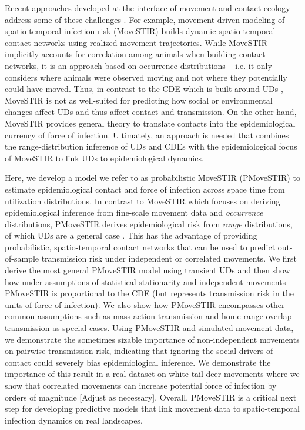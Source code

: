 \documentclass[letterpaper]{article}
\begin{document}
Recent approaches developed at the interface of movement and contact ecology address some of these challenges \citep{Wilber2022,Yang2023}. For example, movement-driven modeling of spatio-temporal infection risk (MoveSTIR) builds dynamic spatio-temporal contact networks using realized movement trajectories. While MoveSTIR implicitly accounts for correlation among animals when building contact networks, it is an approach based on occurrence distributions \citep{Alston2022} -- i.e. it only considers where animals were observed moving and not where they potentially could have moved. Thus, in contrast to the CDE which is built around UDs \citep[a range-distribution method in the terminology of][]{Alston2022}, MoveSTIR is not as well-suited for predicting how social or environmental changes affect UDs and thus affect contact and transmission.  On the other hand, MoveSTIR provides general theory to translate contacts into the epidemiological currency of force of infection. Ultimately, an approach is needed that combines the range-distribution inference of UDs and CDEs \citep{Alston2022,Noonan2021} with the epidemiological focus of MoveSTIR to link UDs to epidemiological dynamics. 

Here, we develop a model we refer to as probabilistic MoveSTIR (PMoveSTIR) to estimate epidemiological contact and force of infection across space time from utilization distributions. In contrast to MoveSTIR which focuses on deriving epidemiological inference from fine-scale movement data and \emph{occurrence} distributions, PMoveSTIR derives epidemiological risk from \emph{range} distributions, of which UDs are a general case \citep{Alston2022}.  This has the advantage of providing probabilistic, spatio-temporal contact networks that can be used to predict out-of-sample transmission risk under independent or correlated movements. We first derive the most general PMoveSTIR model using transient UDs and then show how under assumptions of statistical stationarity and independent movements PMoveSTIR is proportional to the CDE (but represents transmission risk in the units of force of infection). We also show how PMoveSTIR encompasses other common assumptions such as mass action transmission and home range overlap transmission as special cases.  Using PMoveSTIR and simulated movement data, we demonstrate the sometimes sizable importance of non-independent movements on pairwise transmission risk, indicating that ignoring the social drivers of contact could severely bias epidemiological inference.  We demonstrate the importance of this result in a real dataset on white-tail deer movements where we show that correlated movements can increase potential force of infection by orders of magnitude [Adjust as necessary].  Overall, PMoveSTIR is a critical next step for developing predictive models that link movement data to spatio-temporal infection dynamics on real landscapes.
\end{document}
